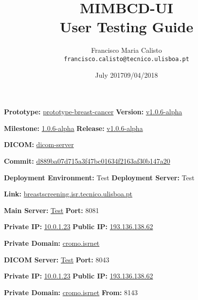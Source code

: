 \documentclass{article}
\title{
MIMBCD-UI
\\
User Testing Guide
}
\author{
  Francisco Maria Calisto\\
  \texttt{francisco.calisto@tecnico.ulisboa.pt}
}
\date{July 2017}
\date{09/04/2018}
\begin{document}
\maketitle

\textbf{Prototype:} \hyperlink{https://github.com/MIMBCD-UI/prototype-breast-cancer}{prototype-breast-cancer} \hfill \textbf{Version:} \hyperlink{https://github.com/MIMBCD-UI/prototype-breast-screening/tree/d88150f25a70153444d185c5eb6c6e99f9b6108a}{v1.0.6-alpha}

\textbf{Milestone:} \hyperlink{https://github.com/MIMBCD-UI/prototype-breast-screening/milestone/6}{1.0.6-alpha} \hfill \textbf{Release:} \hyperlink{https://github.com/MIMBCD-UI/prototype-breast-screening/releases/tag/v1.0.6-alpha}{v1.0.6-alpha}

\hfill

\textbf{DICOM:} \hyperlink{https://github.com/MIMBCD-UI/dicom-server}{dicom-server}

\textbf{Commit:} \hyperlink{https://github.com/MIMBCD-UI/dicom-server/tree/d889ba07d715a3f47bc01634f2163af30b147a20}{d889ba07d715a3f47bc01634f2163af30b147a20}

\hfill

\textbf{Deployment Environment:} Test \hfill \textbf{Deployment Server:} Test

\textbf{Link:} \hyperlink{breastscreening.isr.tecnico.ulisboa.pt}{breastscreening.isr.tecnico.ulisboa.pt}

\hfill

\textbf{Main Server:} \hyperlink{http://breastscreening.isr.tecnico.ulisboa.pt:8081/src/public/index.html}{Test} \hfill \textbf{Port:} 8081

\textbf{Private IP:} \hyperlink{http://10.0.1.23:8081/src/public/index.html}{10.0.1.23} \hfill \textbf{Public IP:} \hyperlink{http://193.136.138.62:8081/src/public/index.html}{193.136.138.62}

\textbf{Private Domain:} \hyperlink{http://cromo.isrnet:8081/src/public/index.html}{cromo.isrnet}

\hfill

\textbf{DICOM Server:} \hyperlink{http://breastscreening.isr.tecnico.ulisboa.pt:8043/app/explorer.html}{Test} \hfill \textbf{Port:} 8043

\textbf{Private IP:} \hyperlink{http://10.0.1.23:8043/app/explorer.html}{10.0.1.23} \hfill \textbf{Public IP:} \hyperlink{http://193.136.138.62:8043/app/explorer.html}{193.136.138.62}

\textbf{Private Domain:} \hyperlink{http://cromo.isrnet:8043/app/explorer.html}{cromo.isrnet} \hfill \textbf{From:} 8143

\clearpage











\clearpage



\end{document}
